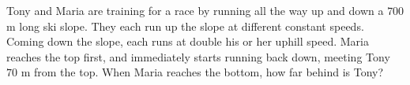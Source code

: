 Tony and Maria are training for a race by running all the way up and down a $700$ m long ski slope. They each run up the slope at different constant speeds. Coming down the slope, each runs at double his or her uphill speed. Maria reaches the top first, and immediately starts running back down, meeting Tony $70$ m from the top. When Maria reaches the bottom, how far behind is Tony?

